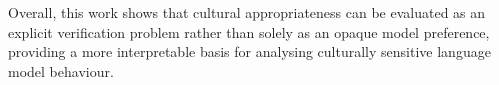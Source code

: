 \documentclass[11pt,a4paper,oneside]{report}
\begin{document}
Overall, this work shows that cultural appropriateness can be evaluated as an explicit verification problem rather than solely as an opaque model preference, providing a more interpretable basis for analysing culturally sensitive language model behaviour.

\tableofcontents
\clearpage
\listoffigures
\clearpage
\listoftables
\clearpage
{}








\appendix






\printbibliography
\end{document}
